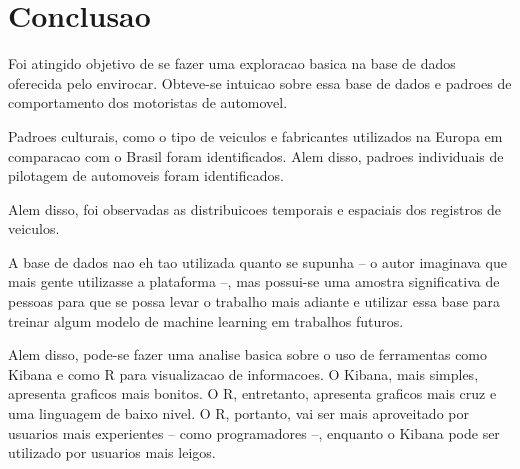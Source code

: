 \documentclass[10pt, conference]{IEEEtran}
\begin{document}
%


\section{Conclusao}
%

Foi atingido objetivo de se fazer uma exploracao basica na base de dados oferecida pelo envirocar. Obteve-se 
intuicao sobre essa base de dados e padroes de comportamento dos motoristas de automovel. 

Padroes culturais,
como o tipo de veiculos e fabricantes utilizados na Europa em comparacao com o Brasil foram identificados. 
Alem disso, padroes individuais de pilotagem de automoveis foram identificados. 

Alem disso, foi observadas as distribuicoes temporais e espaciais dos registros de veiculos.

A base de dados nao eh tao utilizada quanto se supunha -- o autor imaginava que mais gente utilizasse a
plataforma --, mas possui-se uma amostra significativa de pessoas para que se possa levar o trabalho
mais adiante e utilizar essa base para treinar algum modelo de machine learning em trabalhos futuros.

Alem disso, pode-se fazer uma analise basica sobre o uso de ferramentas como Kibana e como R para
visualizacao de informacoes. O Kibana, mais simples, apresenta graficos mais bonitos. O R, entretanto,
apresenta graficos mais cruz e uma linguagem de baixo nivel. O R, portanto, vai ser mais aproveitado
por usuarios mais experientes -- como programadores --, enquanto o Kibana pode ser utilizado por usuarios
mais leigos.



\iffinal
\end{document}
